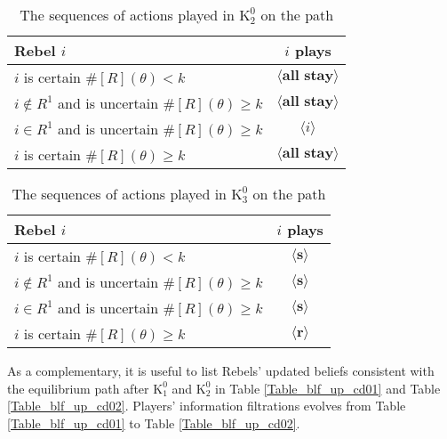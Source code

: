 \documentclass[12pt,letter]{article}
\newcommand{\Kappa}{\mathrm{K}}
\theoremstyle{definition}
\theoremstyle{remark}
\theoremstyle{claim}
\begin{document}
\begin{table}[!htbp]
\caption{The sequences of actions played in $\Kappa^0_{2}$ on the path}
\label{Table_cd021}
\begin{center}
\begin{tabular}{l c}
Rebel $i$ 	 	&  	$i$ plays		 \\
\hline
\hline
$i$ is certain $\#[R](\theta)<k$ 	& 	$\langle \textbf{all stay} \rangle$	\\
$i\notin R^{1}$ and is uncertain $\#[R](\theta)\geq k$	& 	$\langle \textbf{all stay} \rangle$	\\
$i\in R^{1}$ and is uncertain $\#[R](\theta)\geq k$ &  $\langle i \rangle$  \\
$i$ is certain $\#[R](\theta)\geq k$ &  $\langle \textbf{all stay} \rangle$  \\
\hline
\end{tabular}
\end{center}
\end{table}

\begin{table}[!htbp]
\caption{The sequences of actions played in $\Kappa^0_{3}$ on the path}
\label{Table_cd03v}
\begin{center}
\begin{tabular}{l c}
Rebel $i$ 	 	&  	$i$ plays		 \\
\hline
\hline
$i$ is certain $\#[R](\theta)<k$ 	& 	$\langle \textbf{s} \rangle$	\\
$i\notin R^{1}$ and is uncertain $\#[R](\theta)\geq k$	& 	$\langle \textbf{s} \rangle$	\\
$i\in R^{1}$ and is uncertain $\#[R](\theta)\geq k$ &  $\langle \textbf{s} \rangle$  \\
$i$ is certain $\#[R](\theta)\geq k$ &  $\langle \textbf{r} \rangle$  \\
\hline
\end{tabular}
\end{center}
\end{table}
\clearpage

As a complementary, it is useful to list Rebels' updated beliefs consistent with the equilibrium path after $\Kappa^0_1$ and $\Kappa^0_2$ in Table \ref{Table_blf_up_cd01} and Table \ref{Table_blf_up_cd02}. Players' information filtrations evolves from Table \ref{Table_blf_up_cd01} to Table \ref{Table_blf_up_cd02}.
\end{document}
